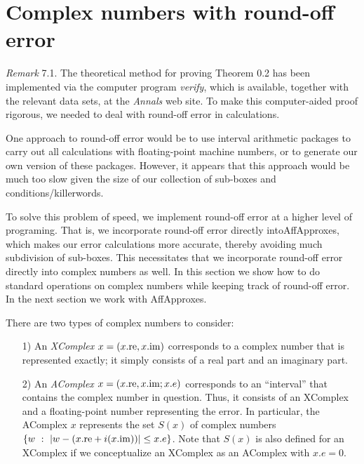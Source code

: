 \section{Complex numbers with round-off error}


{\it Remark} 7.1.
The theoretical method for proving Theorem 0.2 has been implemented via the computer program {\it verify}, which is available, together with the relevant data sets, at the {\it Annals} web site.  To make this computer-aided proof rigorous, we needed to deal with round-off error in calculations.  

One approach to round-off error would be to use interval arithmetic packages to carry out all calculations with floating-point machine numbers, or to generate our own version of these packages.  
However, it appears that this approach
would be much too slow given the size of our collection of sub-boxes and conditions/killerwords.  

To solve this problem of speed, we implement round-off error at a higher level of programing.  That is, we incorporate round-off error directly
 into\break AffApproxes,  which makes our error calculations more accurate, thereby avoiding much subdivision of
sub-boxes. This necessitates that we incorporate round-off error directly into complex numbers as well. 
In this section we show how to do standard operations on complex numbers while keeping track of round-off error.
In the next section we work with  AffApproxes.

There are two types of complex numbers to consider: 

\begin{itemize}
\item[1)]  An {\it XComplex} $x = (x.{\rm re}, x.{\rm im})$ corresponds to a complex number that is represented exactly; it
simply consists of a real part and an imaginary part.

\item[2)]  An {\it AComplex} $x = (x.{\rm re}, x.{\rm im}; x.e)$ corresponds to an ``interval'' that contains the complex number in
question.  Thus, it consists of an XComplex and a floating-point number representing the error.  In particular, the AComplex
$x$ represents the set $S(x)$ of complex numbers\break 
$\{w\ :\ |w - (x.{\rm re} + i (x.{\rm im}))| \le x.e\}$.  Note that $S(x)$ is also defined
for an XComplex if we conceptualize an XComplex as an AComplex with
$x.e = 0.$
\end{itemize}

\enddemo

